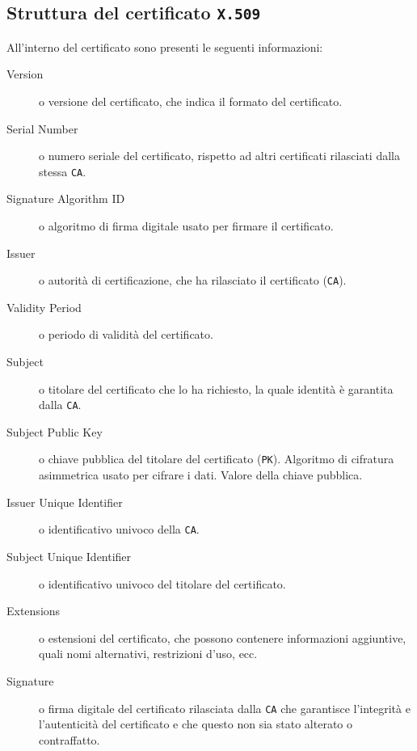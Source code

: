     \subsection{Struttura del certificato \texttt{X.509}}
        All'interno del certificato sono presenti le seguenti informazioni:
        \begin{description}
            \item[Version] o versione del certificato, che indica il formato del certificato.
            \item[Serial Number] o numero seriale del certificato, rispetto ad altri certificati rilasciati dalla stessa \texttt{CA}.
            \item[Signature Algorithm ID] o algoritmo di firma digitale usato per firmare il certificato.
            \item[Issuer] o autorità di certificazione, che ha rilasciato il certificato (\texttt{CA}).
            \item[Validity Period] o periodo di validità del certificato.
            \item[Subject] o titolare del certificato che lo ha richiesto, la quale identità è garantita dalla \texttt{CA}.
            \item[Subject Public Key] o chiave pubblica del titolare del certificato (\texttt{PK}).
                \subitem Algoritmo di cifratura asimmetrica usato per cifrare i dati.
                \subitem Valore della chiave pubblica.
            \item[Issuer Unique Identifier] o identificativo univoco della \texttt{CA}.
            \item[Subject Unique Identifier] o identificativo univoco del titolare del certificato.
            \item[Extensions] o estensioni del certificato, che possono contenere informazioni aggiuntive, quali nomi alternativi, restrizioni d'uso, ecc.
            \item[Signature] o firma digitale del certificato rilasciata dalla \texttt{CA} che garantisce l'integrità e l'autenticità del certificato e che questo non sia stato alterato o contraffatto.
        \end{description}
